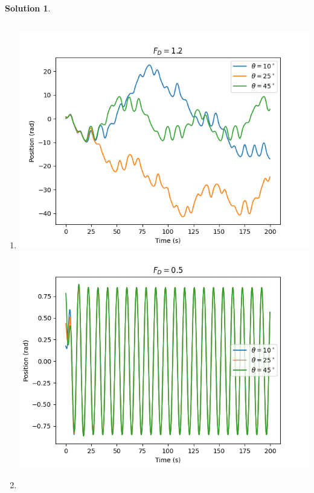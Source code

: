 \documentclass[10pt]{article}
\theoremstyle{definition}
\newtheorem{soln}{Solution}
\begin{document}
\begin{soln}
      \begin{enumerate}[label=(\alph*)]
            \item \inputminted[breaklines, autogobble]{python3}{./python/q2/q2a.py}
                  \begin{center}
                        \includegraphics[scale=0.75]{Figure_5-1.png}
                        \includegraphics[scale=0.75]{Figure_5-2.png}
                  \end{center}
            \item \inputminted[breaklines, autogobble]{python3}{./python/q2/q2b.py}
                  \begin{center}

\end{center}
\end{enumerate}
\end{soln}
\end{document}
